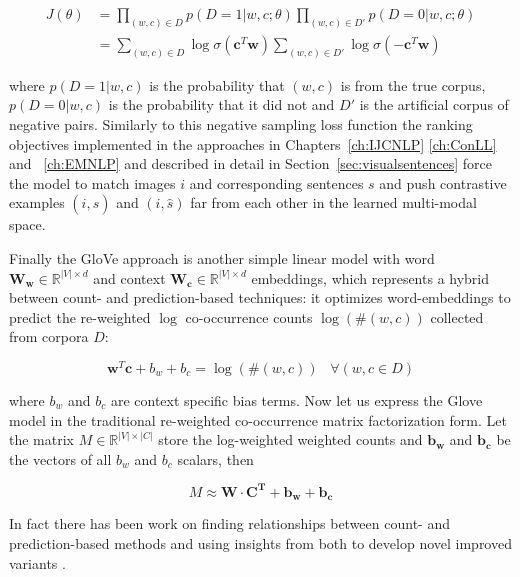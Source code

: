 \begin{align}
J(\theta) &= \prod_{(w,c) \in D} p(D=1|w,c;\theta)  \prod_{(w,c) \in D'}  p(D=0|w,c;\theta) \\
&= \sum_{(w,c) \in D} \log  \sigma(\mathbf{c}^T\mathbf{w}) \sum_{(w,c) \in D'}  \log \sigma(-\mathbf{c}^T\mathbf{w})
\end{align}

where  $p(D=1|w,c)$ is the probability that $(w,c)$ is from the true corpus, $p(D=0|w,c)$ is the
probability that it did not and $D'$ is the artificial corpus of negative pairs.
Similarly to this negative sampling loss function the ranking objectives
implemented in the approaches in Chapters~\ref{ch:IJCNLP} \ref{ch:ConLL} and ~\ref{ch:EMNLP}
and described in detail in Section~\ref{sec:visualsentences} force the model
to match images $i$ and corresponding sentences $s$ and push contrastive examples $(\hat{i},s)$
and $(i,\hat{s})$ far from each other in the learned multi-modal space.

Finally the GloVe approach \citep{pennington2014glove} is another simple linear model
with word $\mathbf{W_w}  \in \mathbb{R}^{|V| \times d}$ and context
$\mathbf{W_c} \in \mathbb{R}^{|V| \times d}$ embeddings, which
represents a hybrid between count- and prediction-based techniques:
it optimizes word-embeddings to predict the re-weighted
$\log$ co-occurrence counts $\log(\#(w,c))$ collected from corpora $D$:

\begin{equation}
\label{eq:glove}
\mathbf{w}^T\mathbf{c} + b_w + b_c = \log(\#(w,c))\;\;\; \forall (w,c \in D)
\end{equation}

where $b_w$ and $b_c$ are context specific bias terms.
Now let us express the Glove model in the traditional re-weighted
co-occurrence matrix factorization form.
Let the matrix $M \in \mathbb{R}^{|V| \times |C|}$ store the log-weighted
weighted counts and $\mathbf{b_w}$ and $\mathbf{b_c}$ be the vectors of all
$b_w$ and $b_c$ scalars, then

\begin{equation}
\label{eq:glove2}
M \approx \mathbf{W} \cdot \mathbf{C^T} + \mathbf{b_w} + \mathbf{b_c}
\end{equation}

In fact there has been work on finding relationships between
count- and prediction-based methods \citep{levy2014neural} and
using insights from both to develop novel improved
variants \citep{levy2015improving}.

